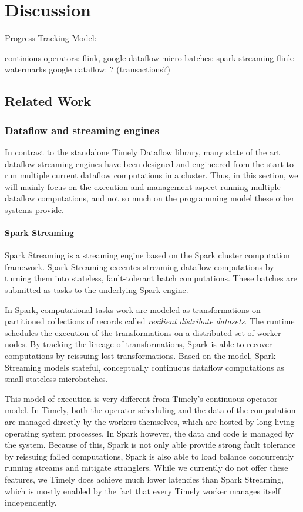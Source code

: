 \chapter{Discussion}\label{ch:discussion}

Progress Tracking Model:

    continious operators: flink, google dataflow
    micro-batches: spark streaming
    flink: watermarks
    google dataflow: ? (transactions?)
    

\section{Related Work}

\subsection{Dataflow and streaming engines}

In contrast to the standalone Timely Dataflow library, many state of the art
dataflow streaming engines have been designed and engineered from the start
to run multiple current dataflow computations in a cluster. Thus, in this
section, we will mainly focus on the execution and management aspect running
multiple dataflow computations, and not so much on the programming model these
other systems provide.

\subsubsection{Spark Streaming}

Spark Streaming \cite{sparkstreaming} is a streaming engine based on the Spark
cluster computation framework. Spark Streaming executes streaming dataflow
computations by turning them into stateless, fault-tolerant batch computations.
These batches are submitted as tasks to the underlying Spark engine. \cite{spark} 

In Spark, computational tasks work are modeled as transformations on partitioned
collections of records called \emph{resilient distribute datasets}. The
runtime schedules the execution of the transformations on a distributed set of
worker nodes. By tracking the lineage of transformations, Spark is able to
recover computations by reissuing lost transformations. Based on the model,
Spark Streaming models stateful, conceptually continuous dataflow computations
as small stateless microbatches.

This model of execution is very different from Timely's continuous operator
model. In Timely, both the operator scheduling and the data of the
computation are managed directly by the workers themselves, which are hosted
by long living operating system processes. In Spark however, the data and code
is managed by the system. Because of this, Spark is not only able provide strong
fault tolerance by reissuing failed computations, Spark is also able to load
balance concurrently running streams and mitigate stranglers. While we currently
do not offer these features, we Timely does achieve much lower latencies than
Spark Streaming, which is mostly enabled by the fact that every Timely
worker manages itself independently.

